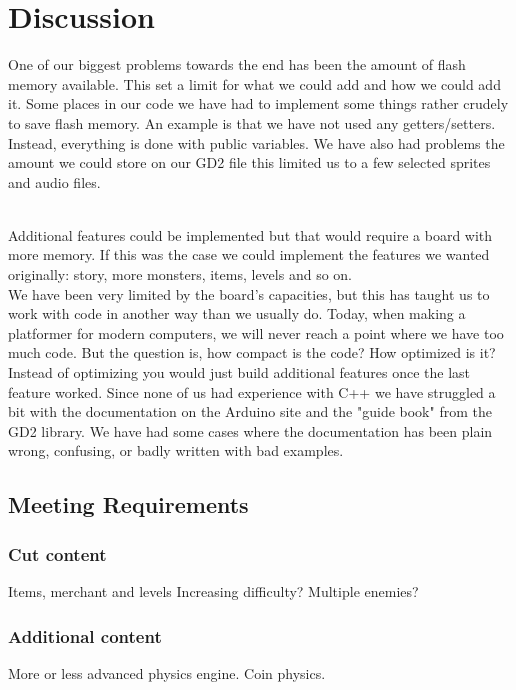 \chapter{Discussion}
 
One of our biggest problems towards the end has been the amount of flash memory available. This set a limit for what we could add and how we could add it. Some places in our code we have had to implement some things rather crudely to save flash memory. An example is that we have not used any getters/setters. Instead, everything is done with public variables. We have also had problems the amount we could store on our GD2 file this limited us to a few selected sprites and audio files.

\\

Additional features could be implemented but that would require a board with more memory. If this was the case we could implement the features we wanted originally: story, more monsters, items, levels and so on.\\
We have been very limited by the board's capacities, but this has taught us to work with code in another way than we usually do. Today, when making a platformer for modern computers, we will never reach a point where we have too much code. But the question is, how compact is the code? How optimized is it? Instead of optimizing you would just build additional features once the last feature worked. Since none of us had experience with C++ we have struggled a bit with the documentation on the Arduino site and the "guide book" from the GD2 library. We have had some cases where the documentation has been plain wrong, confusing, or badly written with bad examples.


\section{Meeting Requirements}

\subsection*{Cut content}
Items, merchant and levels
Increasing difficulty?
Multiple enemies?
\subsection*{Additional content}
More or less advanced physics engine.
Coin physics.
